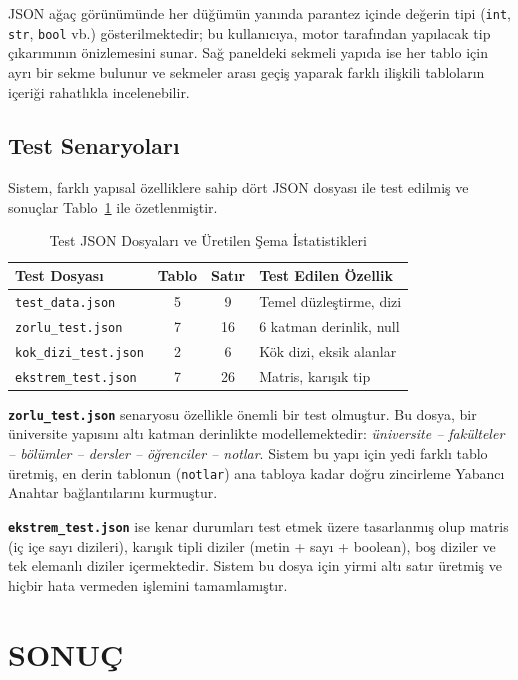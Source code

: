 \documentclass[conference,a4paper,10pt]{IEEEtran}
\begin{document}
JSON ağaç görünümünde her düğümün yanında parantez içinde değerin tipi (\texttt{int}, \texttt{str}, \texttt{bool} vb.) gösterilmektedir; bu kullanıcıya, motor tarafından yapılacak tip çıkarımının önizlemesini sunar. Sağ paneldeki sekmeli yapıda ise her tablo için ayrı bir sekme bulunur ve sekmeler arası geçiş yaparak farklı ilişkili tabloların içeriği rahatlıkla incelenebilir.

\subsection{Test Senaryoları}

Sistem, farklı yapısal özelliklere sahip dört JSON dosyası ile test edilmiş ve sonuçlar Tablo~\ref{tab:test} ile özetlenmiştir.

\begin{table}[!ht]
\caption{Test JSON Dosyaları ve Üretilen Şema İstatistikleri}
\label{tab:test}
\centering
\footnotesize
\begin{tabular}{@{}lccl@{}}
\toprule
\textbf{Test Dosyası} & \textbf{Tablo} & \textbf{Satır} & \textbf{Test Edilen Özellik} \\
\midrule
\texttt{test\_data.json}    & 5 & 9  & Temel düzleştirme, dizi \\
\texttt{zorlu\_test.json}   & 7 & 16 & 6 katman derinlik, null\\
\texttt{kok\_dizi\_test.json} & 2 & 6 & Kök dizi, eksik alanlar \\
\texttt{ekstrem\_test.json} & 7 & 26 & Matris, karışık tip\\
\bottomrule
\end{tabular}
\end{table}

\textbf{\texttt{zorlu\_test.json}} senaryosu özellikle önemli bir test olmuştur. Bu dosya, bir üniversite yapısını altı katman derinlikte modellemektedir: \emph{üniversite -- fakülteler -- bölümler -- dersler -- öğrenciler -- notlar}. Sistem bu yapı için yedi farklı tablo üretmiş, en derin tablonun (\texttt{notlar}) ana tabloya kadar doğru zincirleme Yabancı Anahtar bağlantılarını kurmuştur.

\textbf{\texttt{ekstrem\_test.json}} ise kenar durumları test etmek üzere tasarlanmış olup matris (iç içe sayı dizileri), karışık tipli diziler (metin + sayı + boolean), boş diziler ve tek elemanlı diziler içermektedir. Sistem bu dosya için yirmi altı satır üretmiş ve hiçbir hata vermeden işlemini tamamlamıştır.

\section{SONUÇ}
\end{document}
